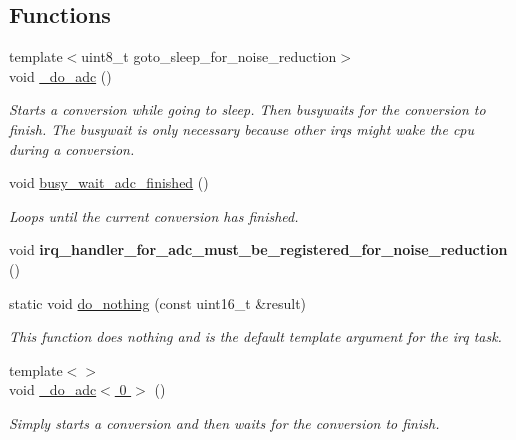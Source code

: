 \subsection*{Functions}
\begin{DoxyCompactItemize}
\item 
{\footnotesize template$<$uint8\+\_\+t goto\+\_\+sleep\+\_\+for\+\_\+noise\+\_\+reduction$>$ }\\void \hyperlink{namespaceadc_ab569dff590b3bb745fb012aa29ec5723}{\+\_\+do\+\_\+adc} ()
\begin{DoxyCompactList}\small\item\em Starts a conversion while going to sleep. Then busywaits for the conversion to finish. The busywait is only necessary because other irqs might wake the cpu during a conversion. \end{DoxyCompactList}\item 
void \hyperlink{namespaceadc_a4228912d1c32eafc1987a8adb80f4984}{busy\+\_\+wait\+\_\+adc\+\_\+finished} ()\hypertarget{namespaceadc_a4228912d1c32eafc1987a8adb80f4984}{}\label{namespaceadc_a4228912d1c32eafc1987a8adb80f4984}

\begin{DoxyCompactList}\small\item\em Loops until the current conversion has finished. \end{DoxyCompactList}\item 
void {\bfseries irq\+\_\+handler\+\_\+for\+\_\+adc\+\_\+must\+\_\+be\+\_\+registered\+\_\+for\+\_\+noise\+\_\+reduction} ()\hypertarget{namespaceadc_a0f2e8fa37ba3e91fc9e7a58e3543eaaa}{}\label{namespaceadc_a0f2e8fa37ba3e91fc9e7a58e3543eaaa}

\item 
static void \hyperlink{namespaceadc_a4d20cd58db88b2e3099aa5689e33235d}{do\+\_\+nothing} (const uint16\+\_\+t \&result)
\begin{DoxyCompactList}\small\item\em This function does nothing and is the default template argument for the irq task. \end{DoxyCompactList}\item 
{\footnotesize template$<$$>$ }\\void \hyperlink{namespaceadc_a6e0b185b550424440d92bc2b129f6128}{\+\_\+do\+\_\+adc$<$ 0 $>$} ()
\begin{DoxyCompactList}\small\item\em Simply starts a conversion and then waits for the conversion to finish. \end{DoxyCompactList}\end{DoxyCompactItemize}


